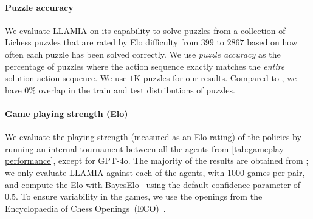 \paragraph{Puzzle accuracy}
We evaluate LLAMIA on its capability to solve puzzles from a collection of Lichess puzzles that are rated by Elo difficulty from $399$ to $2867$ based on how often each puzzle has been solved correctly. We use \emph{puzzle accuracy} as the percentage of puzzles where the action sequence exactly matches the \emph{entire} solution action sequence. We use $1$K puzzles for our results. Compared to \cite{ruoss2024grandmaster}, we have 0\% overlap in the train and test distributions of puzzles.

\paragraph{Game playing strength (Elo)}
We evaluate the playing strength (measured as an Elo rating) of the policies by running an internal tournament between all the agents from \cref{tab:gameplay-performance}, except for GPT-4o. The majority of the results are obtained from \cite{ruoss2024grandmaster}; we only evaluate LLAMIA against each of the agents, with $1000$ games per pair, and compute the Elo with BayesElo~\citep{coulom2008whole} using the default confidence parameter of $0.5$. To ensure variability in the games, we use the openings from the Encyclopaedia of Chess Openings~(ECO)~\citep{matanovic1978eco}.


